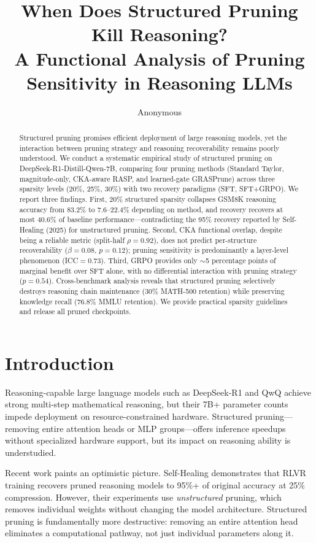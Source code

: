 \documentclass[11pt,a4paper]{article}
\title{When Does Structured Pruning Kill Reasoning?\\A Functional Analysis of Pruning Sensitivity in Reasoning LLMs}
\author{Anonymous}
\begin{document}
\maketitle

\begin{abstract}
Structured pruning promises efficient deployment of large reasoning models, yet the interaction between pruning strategy and reasoning recoverability remains poorly understood.
We conduct a systematic empirical study of structured pruning on DeepSeek-R1-Distill-Qwen-7B, comparing four pruning methods (Standard Taylor, magnitude-only, CKA-aware RASP, and learned-gate GRASPrune) across three sparsity levels (20\%, 25\%, 30\%) with two recovery paradigms (SFT, SFT+GRPO).
We report three findings.
First, 20\% structured sparsity collapses GSM8K reasoning accuracy from 83.2\% to 7.6--22.4\% depending on method, and recovery recovers at most 40.6\% of baseline performance---contradicting the 95\% recovery reported by Self-Healing (2025) for unstructured pruning.
Second, CKA functional overlap, despite being a reliable metric (split-half $\rho=0.92$), does not predict per-structure recoverability ($\beta=0.08$, $p=0.12$); pruning sensitivity is predominantly a layer-level phenomenon (ICC$=0.73$).
Third, GRPO provides only $\sim$5 percentage points of marginal benefit over SFT alone, with no differential interaction with pruning strategy ($p=0.54$).
Cross-benchmark analysis reveals that structured pruning selectively destroys reasoning chain maintenance (30\% MATH-500 retention) while preserving knowledge recall (76.8\% MMLU retention).
We provide practical sparsity guidelines and release all pruned checkpoints.
\end{abstract}

\section{Introduction}
\label{sec:intro}

Reasoning-capable large language models such as DeepSeek-R1 \cite{deepseek2025r1} and QwQ \cite{qwq2024} achieve strong multi-step mathematical reasoning, but their 7B+ parameter counts impede deployment on resource-constrained hardware.
Structured pruning---removing entire attention heads or MLP groups---offers inference speedups without specialized hardware support, but its impact on reasoning ability is understudied.

Recent work paints an optimistic picture.
Self-Healing \cite{selfhealing2025} demonstrates that RLVR training recovers pruned reasoning models to 95\%+ of original accuracy at 25\% compression.
However, their experiments use \emph{unstructured} pruning, which removes individual weights without changing the model architecture.
Structured pruning is fundamentally more destructive: removing an entire attention head eliminates a computational pathway, not just individual parameters along it.
\end{document}

